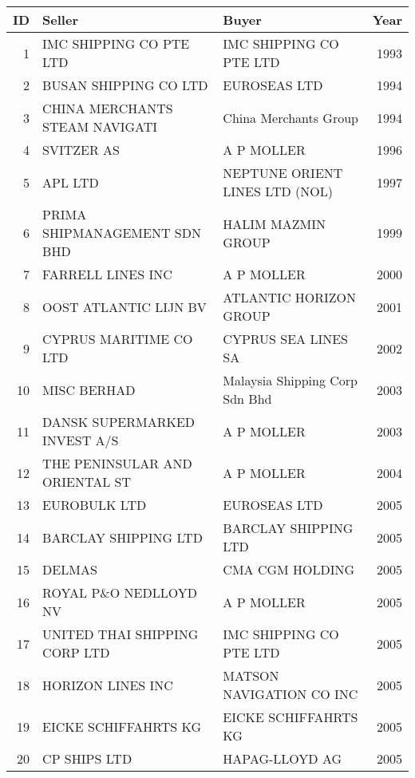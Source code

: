 
\begin{tabular}[t]{rllr}
\toprule
ID & Seller & Buyer & Year\\
\midrule
1 & IMC SHIPPING CO PTE LTD & IMC SHIPPING CO PTE LTD & 1993\\
2 & BUSAN SHIPPING CO LTD & EUROSEAS LTD & 1994\\
3 & CHINA MERCHANTS STEAM NAVIGATI & China Merchants Group & 1994\\
4 & SVITZER AS & A P MOLLER & 1996\\
5 & APL LTD & NEPTUNE ORIENT LINES LTD (NOL) & 1997\\
6 & PRIMA SHIPMANAGEMENT SDN BHD & HALIM MAZMIN GROUP & 1999\\
7 & FARRELL LINES INC & A P MOLLER & 2000\\
8 & OOST ATLANTIC LIJN BV & ATLANTIC HORIZON GROUP & 2001\\
9 & CYPRUS MARITIME CO LTD & CYPRUS SEA LINES SA & 2002\\
10 & MISC BERHAD & Malaysia Shipping Corp Sdn Bhd & 2003\\
11 & DANSK SUPERMARKED INVEST A/S & A P MOLLER & 2003\\
12 & THE PENINSULAR AND ORIENTAL ST & A P MOLLER & 2004\\
13 & EUROBULK LTD & EUROSEAS LTD & 2005\\
14 & BARCLAY SHIPPING LTD & BARCLAY SHIPPING LTD & 2005\\
15 & DELMAS & CMA CGM HOLDING & 2005\\
16 & ROYAL P\&O NEDLLOYD NV & A P MOLLER & 2005\\
17 & UNITED THAI SHIPPING CORP LTD & IMC SHIPPING CO PTE LTD & 2005\\
18 & HORIZON LINES INC & MATSON NAVIGATION CO INC & 2005\\
19 & EICKE SCHIFFAHRTS KG & EICKE SCHIFFAHRTS KG & 2005\\
20 & CP SHIPS LTD & HAPAG-LLOYD AG & 2005\\
\bottomrule
\end{tabular}
